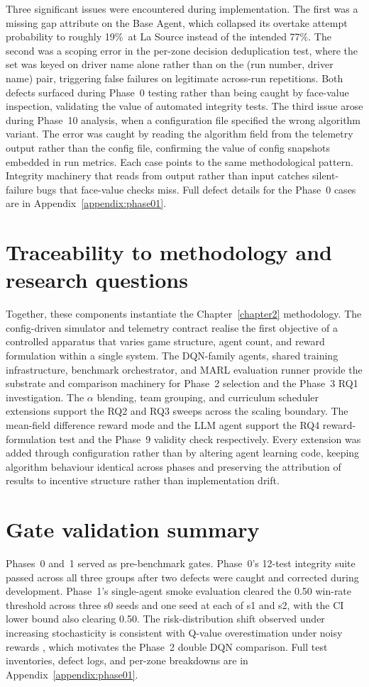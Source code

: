 Three significant issues were encountered during implementation. The first was a missing gap attribute on the Base Agent, which collapsed its overtake attempt probability to roughly 19\%\ at La Source instead of the intended 77\%. The second was a scoping error in the per-zone decision deduplication test, where the set was keyed on driver name alone rather than on the (run number, driver name) pair, triggering false failures on legitimate across-run repetitions. Both defects surfaced during Phase~0 testing rather than being caught by face-value inspection, validating the value of automated integrity tests. The third issue arose during Phase~10 analysis, when a configuration file specified the wrong algorithm variant. The error was caught by reading the algorithm field from the telemetry output rather than the config file, confirming the value of config snapshots embedded in run metrics. Each case points to the same methodological pattern. Integrity machinery that reads from output rather than input catches silent-failure bugs that face-value checks miss. Full defect details for the Phase~0 cases are in Appendix~\ref{appendix:phase01}.

\section{Traceability to methodology and research questions}

Together, these components instantiate the Chapter~\ref{chapter2} methodology. The config-driven simulator and telemetry contract realise the first objective of a controlled apparatus that varies game structure, agent count, and reward formulation within a single system. The DQN-family agents, shared training infrastructure, benchmark orchestrator, and MARL evaluation runner provide the substrate and comparison machinery for Phase~2 selection and the Phase~3 RQ1 investigation. The $\alpha$ blending, team grouping, and curriculum scheduler extensions support the RQ2 and RQ3 sweeps across the scaling boundary. The mean-field difference reward mode and the LLM agent support the RQ4 reward-formulation test and the Phase~9 validity check respectively. Every extension was added through configuration rather than by altering agent learning code, keeping algorithm behaviour identical across phases and preserving the attribution of results to incentive structure rather than implementation drift.

\section{Gate validation summary}

Phases~0 and~1 served as pre-benchmark gates. Phase~0's 12-test integrity suite passed across all three groups after two defects were caught and corrected during development. Phase~1's single-agent smoke evaluation cleared the 0.50 win-rate threshold across three s0 seeds and one seed at each of s1 and s2, with the CI lower bound also clearing 0.50. The risk-distribution shift observed under increasing stochasticity is consistent with Q-value overestimation under noisy rewards \citep{vanhasselt2016double}, which motivates the Phase~2 double DQN comparison. Full test inventories, defect logs, and per-zone breakdowns are in Appendix~\ref{appendix:phase01}.
